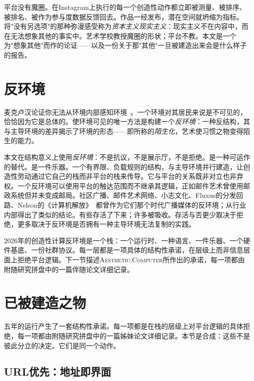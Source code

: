 \documentclass[10pt,letterpaper,twocolumn]{article}
\newcommand{\ac}{\textsc{Aesthetic.Computer}}
\begin{document}
平台没有魔圈。在Instagram上执行的每一个创造性动作都立即被测量、被排序、被排名、被作为参与度数据反馈回去。作品一经发布，潜在空间就坍缩为指标。\citet{fisher2009capitalist}将"没有另选项"的那种弥漫感受称为\emph{资本主义现实主义}：现实主义不在内容中，而在无法想象其他的事实中。艺术学校教授魔圈的形状；平台不教。本文是一个为"想象其他"而作的论证——以及一份关于那"其他"一旦被建造出来会是什么样子的报告。

\section{反环境}

麦克卢汉论证你无法从环境内部感知环境~\citep{mcluhan1964understanding, mcluhan1969playboy}。一个环境对其居民来说是不可见的，恰恰因为它是总体的。使环境可见的唯一方法是构建一个\emph{反环境}：一种反结构，其与主导环境的差异揭示了环境的形态——即\citet{shklovsky1917art}所称的\emph{陌生化}，艺术使习惯之物变得陌生的能力。

本文在结构意义上使用\emph{反环境}：不是抗议，不是展示厅，不是拒绝。是一种可运作的替代。是一件乐器。一个有界限、负载规则的结构，与主导环境并行建造，让创造性劳动通过它自己的栈而非平台的栈来传导。它与平台的关系既非对立也非弃权。一个反环境可以使用平台的触达范围而不继承其逻辑，正如邮件艺术曾使用邮政系统但并未变成邮局。社区广播、邮件艺术网络、小志文化、Fluxus的分发回路、Nelson的《计算机解放》~\citep{nelson1974computerlib}都曾作为它们那个时代广播媒体的反环境；\citet{lanier2018ten}从行业内部得出了类似的结论。有些存活了下来；许多被吸收。存活与否更少取决于拒绝，更多取决于反环境是否拥有一种主导环境无法复制的实践。

2026年的创造性计算反环境是一个栈：一个运行时、一种语言、一件乐器、一个硬件基底、一份社群协议。每一层都是一项具体的结构性承诺，在层级上而非信息层面上拒绝平台逻辑。下一节描述\ac{}所作出的承诺，每一项都由附随研究拼盘中的一篇伴随论文详细记录。

\section{已被建造之物}

五年的运行产生了一套结构性承诺。每一项都是在栈的层级上对平台逻辑的具体拒绝，每一项都由附随研究拼盘中的一篇姊妹论文详细记录。本节是合成：这些不是彼此分立的决定。它们是同一个动作。

\subsection{URL优先：地址即界面}
\end{document}
